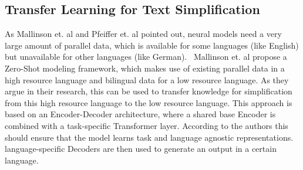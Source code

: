\subsection{Transfer Learning for Text Simplification}
As Mallinson et. al and Pfeiffer et. al pointed out, neural models need a very large amount of parallel data, which is available for some languages (like English)
but unavailable for other languages (like German).~\cite{Mallinson2020, Pfeiffer2020}
Mallinson et. al propose a Zero-Shot modeling framework, which makes use of existing parallel data in a high resource language
and bilingual data for a low resource language. As they argue in their research, this can be used to transfer knowledge for simplification
from this high resource language to the low resource language.
This approach is based on an Encoder-Decoder architecture, where a shared base Encoder is combined with a task-specific Transformer layer.
According to the authors this should ensure that the model learns task and language agnostic representations.
language-specific Decoders are then used to generate an output in a certain language.










